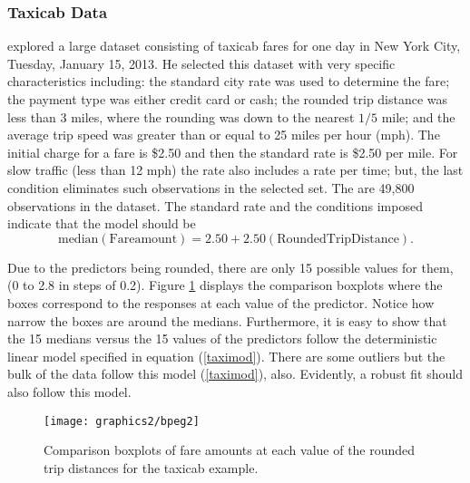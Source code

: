 \subsubsection{Taxicab Data}

\citet{sh15} explored a large dataset consisting of taxicab fares for one day
in New York City, Tuesday, January 15, 2013.
He selected this dataset with very specific characteristics including:
the standard city rate was used to determine the fare;
the payment type was either credit card or cash;
the rounded trip distance was less than 3 miles, where the rounding was down to the
nearest $1/5$ mile;
and the average trip speed was greater than or equal to 25 miles per hour (mph).
The initial charge  for a fare is \$2.50 and then the standard rate is \$2.50 per mile.
For slow traffic (less than 12 mph) the rate also includes a rate per time; but, the last condition
eliminates such observations in the selected set.
The are 49,800 observations in the dataset.
The standard rate and the conditions imposed indicate that the model should be
\begin{equation}
	\label{taximod}
	\mbox{median}(\mbox{Fareamount}) = 2.50 + 2.50(\mbox{RoundedTripDistance}).
\end{equation}

Due to the predictors being rounded, there are only 15 possible values for them, (0 to 2.8
in steps of 0.2).
Figure \ref{figeg21} displays the comparison boxplots where
the boxes correspond to the responses at each value of the predictor.
Notice how narrow the boxes are around the medians.
Furthermore, it is easy to show that the 15 medians versus the 15 values of the predictors
follow the deterministic linear model specified in 
equation (\ref{taximod}).
There are some outliers but the bulk of the data follow this model (\ref{taximod}), also.
Evidently, a robust fit should also follow this model.

\begin{figure}
\centering
\texttt{[image: graphics2/bpeg2]}
        \caption{Comparison boxplots of fare amounts at each value of the rounded trip distances
	for the taxicab example.}
\label{figeg21}
\end{figure}


